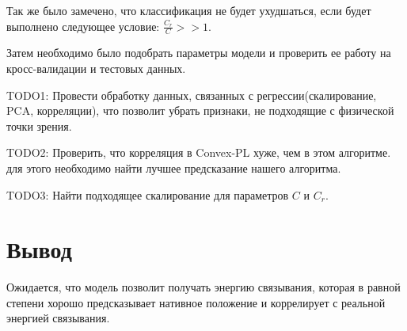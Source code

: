 \documentclass[CEJM,PDF]{Class+Reg_in_Molec_Docking} %
\begin{document}
Так же было замечено, что классификация не будет ухудшаться, если будет выполнено следующее условие: $\frac{C_r}{C}>>1$.

Затем необходимо было подобрать параметры модели и проверить ее работу на кросс-валидации и тестовых данных.

TODO1: Провести обработку данных, связанных с регрессии(скалирование, PCA, корреляции), что позволит убрать признаки, не подходящие с физической точки зрения.

TODO2: Проверить, что корреляция в Convex-PL хуже, чем в этом алгоритме. для этого необходимо найти лучшее предсказание нашего алгоритма.

TODO3: Найти подходящее скалирование для параметров $C$ и $C_r$.

\section{Вывод}

Ожидается, что модель позволит получать энергию связывания, которая в равной степени хорошо предсказывает нативное положение и коррелирует с реальной энергией связывания.





\newpage



\end{document}
